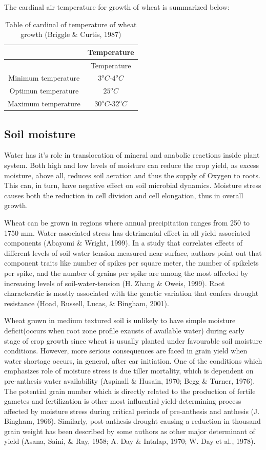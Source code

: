\documentclass[12pt,oneside]{dukestatscithesis} %
\theoremstyle{definition}
\theoremstyle{definition}
\theoremstyle{definition}
\theoremstyle{remark}
\begin{document}
The cardinal air temperature for growth of wheat is summarized below:
\begin{longtable}[]{@{}cc@{}}
\caption{Table of cardinal of temperature of wheat growth (Briggle \&
Curtis, 1987)}\tabularnewline
\toprule
& Temperature\tabularnewline
\midrule
\endfirsthead
\toprule
& Temperature\tabularnewline
\midrule
\endhead
Minimum temperature & \(3^oC\)-\(4^oC\)\tabularnewline
Optimun temperature & \(25^oC\)\tabularnewline
Maximum temperature & \(30^oC\)-\(32^oC\)\tabularnewline
\bottomrule
\end{longtable}
\subsection{Soil moisture}\label{soil-moisture}

Water has it's role in translocation of mineral and anabolic reactions
inside plant system. Both high and low levels of moisture can reduce the
crop yield, as excess moisture, above all, reduces soil aeration and
thus the supply of Oxygen to roots. This can, in turn, have negative
effect on soil microbial dynamics. Moisture stress causes both the
reduction in cell division and cell elongation, thus in overall growth.

Wheat can be grown in regions where annual precipitation ranges from 250
to 1750 mm. Water associated stress has detrimental effect in all yield
associated components (Abayomi \& Wright, 1999). In a study that
correlates effects of different levels of soil water tension measured
near surface, authors point out that component traits like number of
spikes per square meter, the number of spikelets per spike, and the
number of grains per spike are among the most affected by increasing
levels of soil-water-tension (H. Zhang \& Oweis, 1999). Root
characterstic is mostly associated with the genetic variation that
confers drought resistance (Hoad, Russell, Lucas, \& Bingham, 2001).

Wheat grown in medium textured soil is unlikely to have simple moisture
deficit(occurs when root zone profile exausts of available water) during
early stage of crop growth since wheat is usually planted under
favourable soil moisture conditions. However, more serious consequences
are faced in grain yield when water shortage occurs, in general, after
ear initiation. One of the conditions which emphasizes role of moisture
stress is due tiller mortality, which is dependent on pre-anthesis water
availability (Aspinall \& Husain, 1970; Begg \& Turner, 1976). The
potential grain number which is directly related to the production of
fertile gametes and fertilization is other most influential
yield-determining process affected by moisture stress during critical
periods of pre-anthesis and anthesis (J. Bingham, 1966). Similarly,
post-anthesis drought causing a reduction in thousand grain weight has
been described by some authors as other major determinant of yield
(Asana, Saini, \& Ray, 1958; A. Day \& Intalap, 1970; W. Day et al.,
1978).
\end{document}
